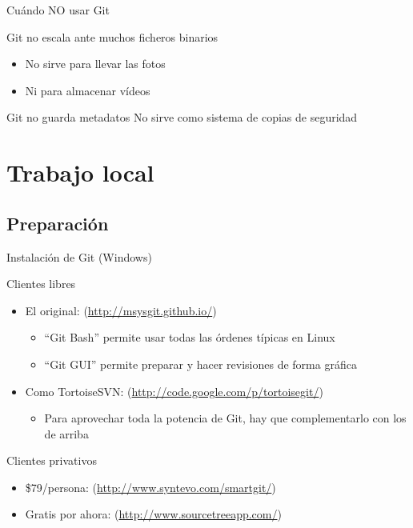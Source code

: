 \documentclass[xcolor=svgnames]{beamer}
\begin{document}
\begin{frame}{Cuándo NO usar Git}

  \begin{block}{Git no escala ante muchos ficheros binarios}
    \begin{itemize}
    \item No sirve para llevar las fotos
    \item Ni para almacenar vídeos
    \end{itemize}
  \end{block}

  \begin{block}{Git no guarda metadatos}
    No sirve como sistema de copias de seguridad
  \end{block}

\end{frame}

\section[Local]{Trabajo local}

\subsection{Preparación}

\begin{frame}{Instalación de Git (Windows)}
  \begin{block}{Clientes libres}
    \begin{itemize}
    \item El original:  (\url{http://msysgit.github.io/})
      \begin{itemize}
      \item ``Git Bash'' permite usar todas las órdenes típicas en Linux
      \item ``Git GUI'' permite preparar y hacer revisiones de forma gráfica
      \end{itemize}
    \item Como TortoiseSVN:  (\url{http://code.google.com/p/tortoisegit/})
      \begin{itemize}
      \item Para aprovechar toda la potencia de Git, hay que complementarlo con los de arriba
      \end{itemize}
    \end{itemize}
  \end{block}

  \begin{block}{Clientes privativos}
    \begin{itemize}
    \item \$79/persona:  (\url{http://www.syntevo.com/smartgit/})
    \item Gratis por ahora:  (\url{http://www.sourcetreeapp.com/})
    \end{itemize}
  \end{block}
\end{frame}
\end{document}

